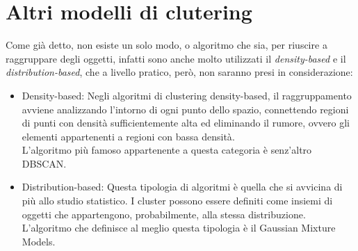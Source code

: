 \section{Altri modelli di clutering}
	Come già detto, non esiste un solo modo, o algoritmo che sia, per riuscire a raggruppare degli oggetti, infatti sono anche molto utilizzati il \emph{density-based} e il \emph{distribution-based}, che a livello pratico, però, non saranno presi in considerazione:

	\begin{itemize}
		\item Density-based:
			Negli algoritmi di clustering density-based, il raggruppamento avviene analizzando l'intorno di ogni punto dello spazio, connettendo regioni di punti con densità sufficientemente alta ed eliminando il rumore, ovvero gli elementi appartenenti a regioni con bassa densità\cite{Density_based_clustering}.\\
			L'algoritmo più famoso appartenente a questa categoria è senz'altro DBSCAN.
		
		\item Distribution-based:
			Questa tipologia di algoritmi è quella che si avvicina di più allo studio statistico. I cluster possono essere definiti come insiemi di oggetti che appartengono, probabilmente, alla stessa distribuzione\cite{distribution-based_clustering}. \\
			L'algoritmo che definisce al meglio questa tipologia è il Gaussian Mixture Models.
	\end{itemize}